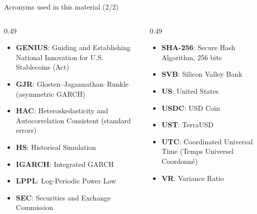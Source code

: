 \begin{frame}{Acronyms used in this material (2/2)}
\begin{columns}[T]
\begin{column}{0.49\textwidth}
\begin{itemize}\setlength{\itemsep}{0pt}
    \item \textbf{GENIUS}: Guiding and Establishing National Innovation for U.S. Stablecoins (Act)
    \item \textbf{GJR}: Glosten–Jagannathan–Runkle (asymmetric GARCH)
    \item \textbf{HAC}: Heteroskedasticity and Autocorrelation Consistent (standard errors)
    \item \textbf{HS}: Historical Simulation
    \item \textbf{IGARCH}: Integrated GARCH
    \item \textbf{LPPL}: Log-Periodic Power Law
    \item \textbf{SEC}: Securities and Exchange Commission
\end{itemize}
\end{column}
\begin{column}{0.49\textwidth}
\begin{itemize}\setlength{\itemsep}{0pt}
    \item \textbf{SHA-256}: Secure Hash Algorithm, 256 bits
    \item \textbf{SVB}: Silicon Valley Bank
    \item \textbf{US}: United States
    \item \textbf{USDC}: USD Coin
    \item \textbf{UST}: TerraUSD
    \item \textbf{UTC}: Coordinated Universal Time (Temps Universel Coordonné)
    \item \textbf{VR}: Variance Ratio
\end{itemize}
\end{column}
\end{columns}
\end{frame}

